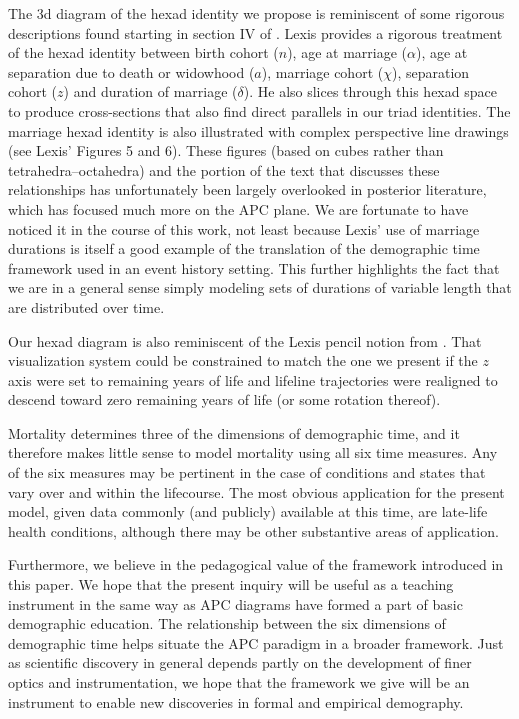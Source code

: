 \documentclass[12pt,oneside,a4paper]{article} %
\begin{document}
The 3d diagram of the hexad identity we propose is reminiscent of some rigorous
descriptions found starting in section IV of \citet{lexis1875einleitung}. Lexis
provides a rigorous treatment of the hexad identity between birth cohort ($n$), age at
marriage ($\alpha$), age at separation due to death or widowhood ($a$), marriage cohort ($\chi$),
separation cohort ($z$) and duration of marriage ($\delta$). He also slices
through this hexad space to produce cross-sections that also find direct
parallels in our triad identities. The marriage hexad identity is also
illustrated with complex perspective line drawings (see Lexis' Figures 5 and 6).
These figures (based on cubes rather than tetrahedra--octahedra) and the portion of
the text that discusses these relationships has unfortunately been largely
overlooked in posterior literature, which has focused much more on the APC
plane. We are fortunate to have noticed it in the course of this work, not least
because Lexis' use of marriage durations is itself a good example of the
translation of the demographic time framework used in an event history setting.
This further highlights the fact that we are in a general sense simply modeling sets of durations of variable length that are distributed over time. 

Our hexad diagram is also reminiscent of the Lexis pencil notion from
\citet{francis1996visualization}. That visualization system could be
constrained to match the one we present if the $z$ axis were set to remaining
years of life and lifeline trajectories were realigned to descend toward zero remaining years of life (or some rotation thereof).

Mortality determines three of the dimensions of
demographic time, and it therefore makes little sense to model mortality using
all six time measures. Any of the six measures may be pertinent in the case of
conditions and states that vary over and within the lifecourse. The most obvious application
for the present model, given data commonly (and publicly) available at this
time, are late-life health conditions, although there may be other substantive
areas of application. 

Furthermore, we believe in the pedagogical value of the framework
introduced in this paper. We hope that the
present inquiry will be useful as a teaching instrument in the same way as APC
diagrams have formed a part of basic demographic education.
The relationship between the six dimensions of demographic time helps situate the APC
paradigm in a broader framework. Just as scientific discovery in general
depends partly on the development of finer optics and instrumentation, we hope
that the framework we give will be an instrument to enable new discoveries
in formal and empirical demography.
\end{document}
